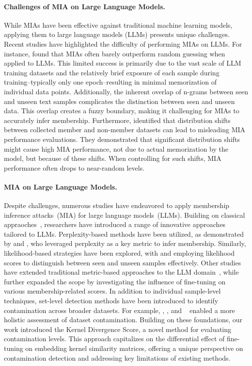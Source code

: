 \paragraph{Challenges of MIA on Large Language Models.}
While MIAs have been effective against traditional machine learning models, applying them to large language models (LLMs) presents unique challenges.
Recent studies have highlighted the difficulty of performing MIAs on LLMs. 
For instance, \citet{duan2024membership} found that MIAs often barely outperform random guessing when applied to LLMs. 
This limited success is primarily due to the vast scale of LLM training datasets and the relatively brief exposure of each sample during training--typically only one epoch--resulting in minimal memorization of individual data points. 
Additionally, the inherent overlap of n-grams between seen and unseen text samples complicates the distinction between seen and unseen data. 
This overlap creates a fuzzy boundary, making it challenging for MIAs to accurately infer membership. 
Furthermore, \citet{meeus2024sok} identified that distribution shifts between collected member and non-member datasets can lead to misleading MIA performance evaluations. 
They demonstrated that significant distribution shifts might cause high MIA performance, not due to actual memorization by the model, but because of these shifts. 
When controlling for such shifts, MIA performance often drops to near-random levels.

\paragraph{MIA on Large Language Models.}
Despite challenges, numerous studies have endeavored to apply membership inference attacks~(MIA) for large language models~(LLMs). 
Building on classical appraoches~\cite{yeom2018privacy, carlini2022membership}, researchers have introduced a range of innovative approaches tailored to LLMs.
Perplexity-based methods have been utilized, as demonstrated by \citet{li2023estimating} and \citet{carlini2021extracting}, who leveraged perplexity as a key metric to infer membership. 
Similarly, likelihood-based strategies have been explored, with \citet{shidetecting} and \citet{zhang2024min} employing likelihood scores to distinguish between seen and unseen samples effectively.
Other studies have extended traditional metric-based approaches to the LLM domain~\cite{duan2024membership,xie2024recall,zhang2024min,mattern2023membership,ye2024data}, while \citet{zhang2024fine} further expanded the scope by investigating the influence of fine-tuning on various membership-related scores.
In addition to individual sample-level techniques, set-level detection methods have been introduced to identify contamination across broader datasets. 
For example, \citet{orenproving}, \citet{zhang2024pacost}, and ~\citet{golchintime} enabled a more holistic assessment of dataset contamination.
Building on these foundations, our work introduced the Kernel Divergence Score, a novel method for evaluating contamination levels. 
This approach capitalizes on the differential effect of fine-tuning on embedding kernel similarity matrices, offering a unique perspective on contamination detection and addressing key limitations of existing methods.